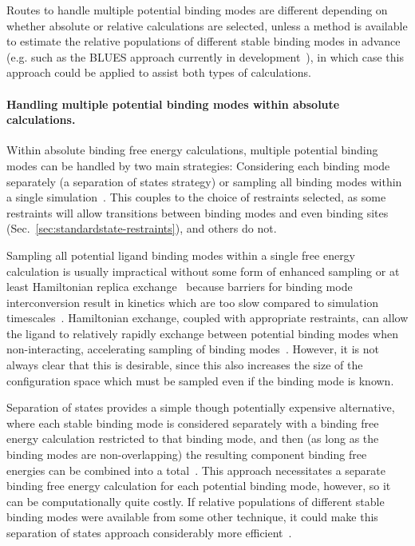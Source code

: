 \documentclass[9pt,bestpractices]{livecoms}
\begin{document}
Routes to handle multiple potential binding modes are different depending on whether absolute or relative calculations are selected, unless a method is available to estimate the relative populations of different stable binding modes in advance (e.g. such as the BLUES approach currently in development~\cite{gill2018binding}), in which case this approach could be applied to assist both types of calculations.

\paragraph{Handling multiple potential binding modes within absolute calculations.}
Within absolute binding free energy calculations, multiple potential binding modes can be handled by two main strategies: Considering each binding mode separately (a separation of states strategy) or sampling all binding modes within a single simulation~\cite{mobley2012perspective}.
This couples to the choice of restraints selected, as some restraints will allow transitions between binding modes and even binding sites (Sec.~\ref{sec:standardstate-restraints}), and others do not.

Sampling all potential ligand binding modes within a single free energy calculation is usually impractical without some form of enhanced sampling or at least Hamiltonian replica exchange~\cite{wang2013identifying} because barriers for binding mode interconversion result in kinetics which are too slow compared to simulation timescales~\cite{mobley2006use, palma2012computation,mobley2012perspective, gill2018binding}.
Hamiltonian exchange, coupled with appropriate restraints, can allow the ligand to relatively rapidly exchange between potential binding modes when non-interacting, accelerating sampling of binding modes~\cite{wang2013identifying}. However, it is not always clear that this is desirable, since this also increases the size of the configuration space which must be sampled even if the binding mode is known.

Separation of states provides a simple though potentially expensive alternative, where each stable binding mode is considered separately with a binding free energy calculation restricted to that binding mode, and then (as long as the binding modes are non-overlapping) the resulting component binding free energies can be combined into a total~\cite{mobley2006use, mobley2012perspective}.
This approach necessitates a separate binding free energy calculation for each potential binding mode, however, so it can be computationally quite costly.
If relative populations of different stable binding modes were available from some other technique, it could make this separation of states approach considerably more efficient~\cite{mobley2012perspective, gill2018binding}.
\end{document}
